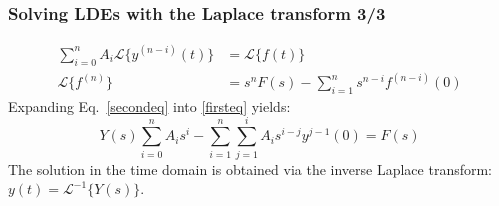 \documentclass{beamer}
\begin{document}
\begin{frame}
\frametitle{Solving LDEs with the Laplace transform 3/3}
\begin{align}
\sum_{i=0}^{n} A_i \mathcal{L}\{y^{(n-i)}(t)\} &= \mathcal{L}\{f(t)\}  \label{firsteq} \\
\mathcal{L}\{f^{(n)}\} &= s^n F(s) - \sum_{i=1}^n s^{n-i}f^{(n-i)}(0) \label{secondeq}
\end{align}
\pause
Expanding Eq.~\eqref{secondeq} into \eqref{firsteq} yields:
\begin{equation*}
Y(s)\sum_{i=0}^n A_i s^i - \sum_{i=1}^n \sum_{j=1}^i A_i s^{i-j}y^{j-1}(0) = F(s)
\end{equation*}
\pause
The solution in the time domain is obtained via the inverse Laplace transform: $y(t) = \mathcal{L}^{-1}\{Y(s)\}$.
\end{frame}
\end{document}
